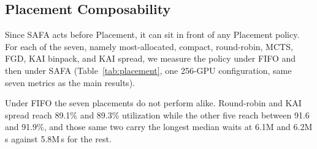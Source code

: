 \documentclass{ieeetj}
\begin{document}
\begin{table}[htb!]
\centering
\caption{Generalization across independent large-scale traces}
\label{tab:trace3}
\scriptsize
\setlength{\tabcolsep}{4pt}
\end{table}

\subsection{Placement Composability}\label{eval:robust:placement}
Since SAFA acts before Placement, it can sit in front of any Placement policy. For each of the seven, namely most-allocated, compact, round-robin, MCTS, FGD, KAI binpack, and KAI spread, we measure the policy under FIFO and then under SAFA (Table~\ref{tab:placement}, one 256-GPU configuration, same seven metrics as the main results).

Under FIFO the seven placements do not perform alike. Round-robin and KAI spread reach 89.1\% and 89.3\% utilization while the other five reach between 91.6 and 91.9\%, and those same two carry the longest median waits at 6.1M and 6.2M\,s against 5.8M\,s for the rest.
\end{document}
